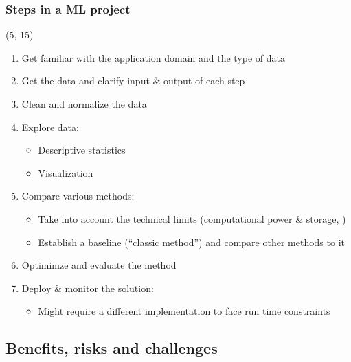 \begin{frame}
  \frametitle{Steps in a \ac{ML} project}

  \begin{textblock}{90}(5, 15)
    \begin{enumerate}
    \item Get familiar with the application domain and the type of data
    \item Get the data and clarify input \& output of each step
    \item Clean and normalize the data
    \item Explore data:
      \begin{itemize}
      \item Descriptive statistics
      \item Visualization
      \end{itemize}
    \item Compare various methods:
      \begin{itemize}
      \item Take into account the technical limits (computational power \&
        storage, \etc{})
      \item Establish a baseline (``classic method'') and compare other methods
        to it
      \end{itemize}
    \item Optimimze and evaluate the method
    \item Deploy \& monitor the solution:
      \begin{itemize}
      \item Might require a different implementation to face run time constraints
      \end{itemize}
    \end{enumerate}
  \end{textblock}
\end{frame}


\subsection{Benefits, risks and challenges}

